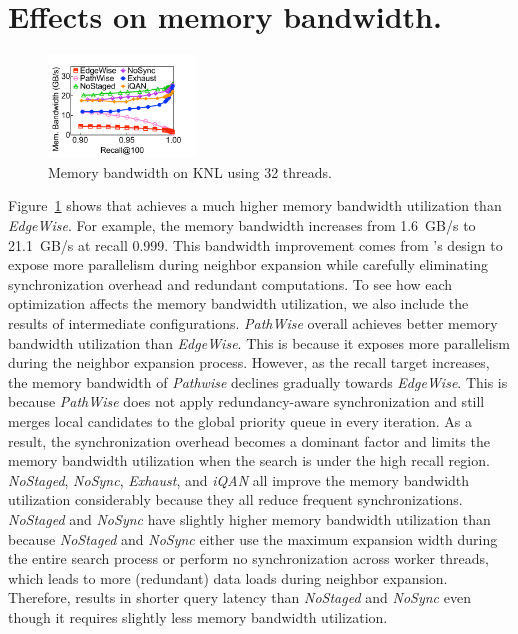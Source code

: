 {
\section{Effects on memory bandwidth.}

\begin{figure}[h]
\centering
\includegraphics[width=0.35\textwidth]{submissions/Minjia2023/figures/eva_mem_bandwidth_KNL}
\caption{Memory bandwidth on KNL using 32 threads.}
\label{minjia_fig:eva_mem_bandwidth_KNL}
\end{figure}

Figure~\ref{minjia_fig:eva_mem_bandwidth_KNL} shows that {\Hammer} achieves a much higher memory bandwidth utilization than \emph{EdgeWise}. For example, the memory bandwidth increases from 1.6~GB/s to 21.1~GB/s at recall 0.999. This bandwidth improvement comes from \Hammer's design to expose more parallelism during neighbor expansion while carefully eliminating synchronization overhead and redundant computations. 
To see how each optimization affects the memory bandwidth utilization, we also include the results of intermediate configurations. \emph{PathWise} overall achieves better memory bandwidth utilization than \emph{EdgeWise}. This is because it exposes more parallelism during the neighbor expansion process. However, as the recall target increases, the memory bandwidth of \emph{Pathwise} declines gradually towards \emph{EdgeWise}. This is because \emph{PathWise} does not apply redundancy-aware synchronization and still merges local candidates to the global priority queue in every iteration. As a result, the synchronization overhead becomes a dominant factor and limits the memory bandwidth utilization when the search is under the high recall region.
\emph{NoStaged}, \emph{NoSync}, \emph{Exhaust}, and \emph{iQAN} all improve the memory bandwidth utilization considerably because they all reduce frequent synchronizations.
\emph{NoStaged} and \emph{NoSync} have slightly higher memory bandwidth utilization than \Hammer because \emph{NoStaged} and \emph{NoSync} either use the maximum expansion width during the entire search process or perform no synchronization across worker threads, which leads to more (redundant) data loads during neighbor expansion. Therefore, \Hammer results in shorter query latency than \emph{NoStaged} and \emph{NoSync} even though it requires slightly less memory bandwidth utilization.  

}
